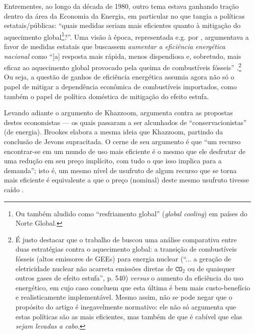 Entrementes, ao longo da década de 1980, outro tema estava ganhando tração dentro da área da Economia da Energia, em particular no que tangia a políticas estatais/públicas: ``quais medidas seriam mais eficientes quanto à mitigação do aquecimento global\footnote{Ou também aludido como ``resfriamento global'' (\textit{global cooling}) em países do Norte Global.}?''. Uma visão à época, representada e.g. por \textcite{Keepin1988,Keepin1989}, argumentava a favor de medidas estatais que buscassem \textit{aumentar a eficiência energética nacional} como ``[a] resposta mais rápida, menos dispendiosa e, sobretudo, mais eficaz ao aquecimento global provocado pela queima de combustíveis fósseis'' \parencite[p. 554]{Keepin1988}.\footnote{É justo destacar que o trabalho de \textcite{Keepin1988} buscou uma análise comparativa entre duas estratégias contra o aquecimento global: a transição de combustíveis fósseis (altos emissores de GEEs) para energia nuclear (``... a geração de eletricidade nuclear não acarreta emissões diretas de $\texttt{CO}_2$ ou de quaisquer outros gases de efeito estufa'', p. 540) \textit{versus} o aumento da eficiência do uso energético, em cujo caso concluem que esta última é bem mais custo-benefício e realisticamente implementável. Mesmo assim, não se pode negar que o propósito do artigo é inegavelmente normativo: ele não só argumenta que estas políticas são as mais eficientes, mas também de que é cabível que elas \textit{sejam levadas a cabo}.} Ou seja, a questão de ganhos de eficiência energética assumia agora não só o papel de mitigar a dependência econômica de combustíveis importados, como também o papel de política doméstica de mitigação do efeito estufa.

Levando adiante o argumento de Khazzoom, \textcite{Brookes1990,Brookes1990a} argumenta contra as propostas destes economistas --- os quais passaram a ser alcunhados de ``conservacionistas'' (de energia). Brookes elabora a mesma ideia que Khazzoom, partindo da conclusão de Jevons supracitada. O cerne de seu argumento é que ``um recurso encontrar-se em um mundo de uso mais eficiente é o mesmo que ele desfrutar de uma redução em seu preço implícito, com tudo o que isso implica para a demanda''; isto é, um mesmo nível de usufruto de algum recurso que se torna mais eficiente é equivalente a que o preço (nominal) deste mesmo usufruto tivesse caído \parencite[p. 319]{Brookes1990}. 

